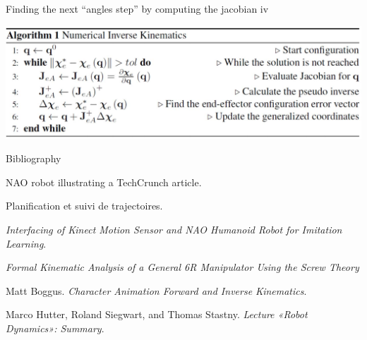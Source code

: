 \documentclass{beamer}
\begin{document}
\begin{frame}{Finding the next ``angles step'' by computing the jacobian iv}

	\includegraphics[scale = 0.3]{eth3.PNG}\cite{6}
\end{frame}






\begin{frame}[allowframebreaks]{Bibliography}
	\begin{thebibliography}{9}

		NAO robot illustrating a TechCrunch article.

		Planification et suivi de trajectoires.

		\textit{Interfacing of Kinect Motion Sensor and NAO Humanoid Robot for Imitation Learning}.

		\textit{Formal Kinematic Analysis of a General 6R Manipulator Using the Screw Theory}

		Matt Boggus.
		\textit{Character Animation Forward and Inverse Kinematics}.

		Marco Hutter, Roland Siegwart, and Thomas Stastny.
		\textit{Lecture «Robot Dynamics»: Summary}.
	\end{thebibliography}
\end{frame}
\end{document}

